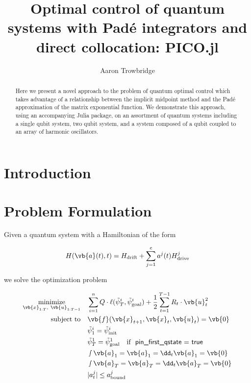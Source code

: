 \documentclass{article}
\title{Optimal control of quantum systems with Pad\'e integrators and direct collocation: PICO.jl}
\author{Aaron Trowbridge}
\date{}
\newcommand{\isopsi}{\tilde \psi}
\begin{document}
\maketitle


\begin{abstract}
  Here we present a novel approach to the problem of quantum optimal control which takes advantage of a relationship between the implicit midpoint method and the Pad\'e approximation of the matrix exponential function. We demonstrate this approach, using an accompanying Julia package, on an assortment of quantum systems including a single qubit system, two qubit system, and a system composed of a qubit coupled to an array of harmonic oscillators.
\end{abstract}

\tableofcontents

\newpage


\section{Introduction}

\section{Problem Formulation}

Given a quantum system with a Hamiltonian of the form

$$
H(\vb{{a}}(t), t ) = H_{\text{drift}} + \sum_{j=1}^c a^j(t) H_{\text{drive}}^j
$$

we solve the optimization problem

\begin{align*}
  \underset{\vb{x}_{1:T}, \ \vb{u}_{1:T-1}}{\text{minimize}} \quad
    & \sum_{i=1}^n Q \cdot \ell(\isopsi_T^i, \isopsi_\text{goal}^i) + \frac{1}{2} \sum_{t=1}^{T-1} R_t \cdot \vb{u}_t^2 \\ 
  \text{subject to} \quad 
    & \vb{f}(\vb{x}_{t+1}, \vb{x}_t, \vb{u}_t) = \vb{0}  \\
    &  \isopsi^i_1 = \isopsi^i_\text{init} \\
    & \isopsi^1_T = \isopsi^1_\text{goal} \quad \text{if }\ \textsf{pin\_first\_qstate = true}\\
    & \smallint \vb{a}_1 = \vb{a}_1 = \dd_t \vb{a}_1 = \vb{0} \\  
    & \smallint \vb{a}_T = \vb{a}_T = \dd_t \vb{a}_T = \vb{0} \\
    & |a^j_t| \leq a^j_\text{bound} \\
\end{align*}
\end{document}
